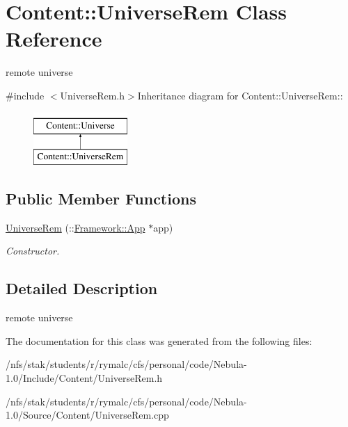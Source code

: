 \hypertarget{classContent_1_1UniverseRem}{
\section{Content::UniverseRem Class Reference}
\label{classContent_1_1UniverseRem}
}


remote universe  


{\ttfamily \#include $<$UniverseRem.h$>$}Inheritance diagram for Content::UniverseRem::\begin{figure}[H]
\begin{center}
\leavevmode
\includegraphics[height=2cm]{classContent_1_1UniverseRem}
\end{center}
\end{figure}
\subsection*{Public Member Functions}
\begin{DoxyCompactItemize}
\item 
\hypertarget{classContent_1_1UniverseRem_acf266bd695f3a885e232e6e711576dc0}{
\hyperlink{classContent_1_1UniverseRem_acf266bd695f3a885e232e6e711576dc0}{UniverseRem} (::\hyperlink{classFramework_1_1App}{Framework::App} $\ast$app)}
\label{classContent_1_1UniverseRem_acf266bd695f3a885e232e6e711576dc0}

\begin{DoxyCompactList}\small\item\em Constructor. \item\end{DoxyCompactList}\end{DoxyCompactItemize}


\subsection{Detailed Description}
remote universe 

The documentation for this class was generated from the following files:\begin{DoxyCompactItemize}
\item 
/nfs/stak/students/r/rymalc/cfs/personal/code/Nebula-\/1.0/Include/Content/UniverseRem.h\item 
/nfs/stak/students/r/rymalc/cfs/personal/code/Nebula-\/1.0/Source/Content/UniverseRem.cpp\end{DoxyCompactItemize}
